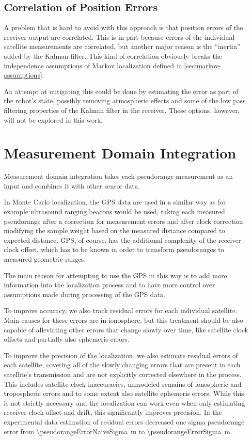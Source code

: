 \subsection{Correlation of Position Errors}
\label{sec:position-domain-correlation}
A problem that is hard to avoid with this approach is that position errors of the
receiver output are correlated.
This is in part because errors of the individual satellite measurements are correlated,
but another major reason
is the \enquote{inertia} added by the Kalman filter.
This kind of correlation obviously breaks the independence assumptions of Markov
localization defined in \cref{sec:markov-assumptions}.

An attempt at mitigating this could be done by estimating the error as part of
the robot's state, possibly removing atmospheric effects and some of the low pass
filtering properties of the Kalman filter in the receiver.
These options, however, will not be explored in this work.

\section{Measurement Domain Integration}
\label{sec:measurement-domain}

Measurement domain integration takes each pseudorange measurement as an input
and combines it with other sensor data.

In Monte Carlo localization, the GPS data are used in a similar way as
for example ultrasound ranging beacons would be used,
taking each measured pseudorange after a correction for measurement errors
and after clock correction modifying the sample weight based on the measured distance
compared to expected distance.
GPS, of course, has the additional complexity of the receiver clock offset, which
has to be known in order to transform pseudoranges to measured geometric ranges.

The main reason for attempting to use the GPS in this way is to add more information
into the localization process and to have more control over assumptions made during
processing of the GPS data.

To improve accuracy, we also track residual errors for each individual satellite.
Main causes for these errors are in ionosphere, but this treatment should be also
capable of alleviating other errors that change slowly over time, like satellite
clock offsets and partially also ephemeris errors.

To improve the precision of the localization, we also estimate residual errors of each satellite,
covering all of the slowly changing errors that are present
in each satellite's transmission and are not explicitly corrected elsewhere in the process.
This includes satellite clock inaccuracies, unmodeled remains of ionospheric and
tropospheric errors and to some extent also satellite ephemeris errors.
While this is not strictly necessary and the localization can work even when only
estimating receiver clock offset and drift, this significantly improves precision.
In the experimental data estimation of residual errors decreased one sigma pseudorange error
from \SI{\pseudorangeErrorNaiveSigma}{\meter} to \SI{\pseudorangeErrorSigma}{\meter}.

